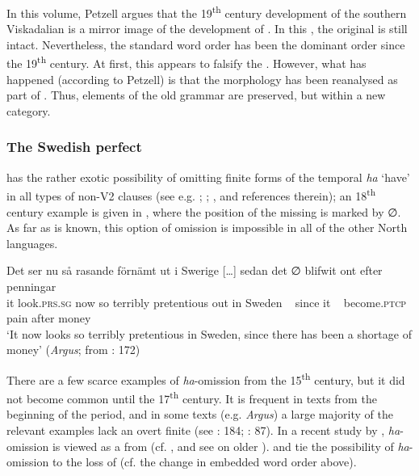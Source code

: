 \documentclass[output=paper]{langscibook}
\begin{document}
In this volume, Petzell argues that the 19\textsuperscript{th} century development of the southern Viskadalian  is a mirror image of the development of . In this , the original  is still intact. Nevertheless, the standard word order has been the dominant order since the 19\textsuperscript{th} century. At first, this appears to falsify the . However, what has happened (according to Petzell) is that the  morphology has been reanalysed as part of . Thus, elements of the old grammar are preserved, but within a new category.


\subsubsection{ The Swedish perfect}\label{sec:intro:3.1.2}


 has the rather exotic possibility of omitting finite forms of the temporal  \textit{ha} ‘have’ in all types of non-V2 clauses (see e.g. \citealt{Julien2002}; \citealt{AndreassonEtAl2004}; \citealt{Backstrom2019}, and references therein); an 18\textsuperscript{th} century example is given in , where the position of the missing  is marked by ∅. As far as is known, this option of  omission is impossible in all of the other North  languages.


\ea\label{ex:intro:6}
\gll  Det     ser         nu   så rasande   förnämt   ut     i   Swerige […] sedan   det ∅ blifwit     ont     efter penningar\\
it     look.\textsc{prs.sg}   now   so terribly   pretentious out in   Sweden ~ since   it  ~ become\textsc{.ptcp}  pain    after money\\
\glt ‘It now looks so terribly pretentious in Sweden, since there has been a shortage of money’ (\textit{Argus}; from \citealt{Johannisson1945}: 172)
\z


There are a few scarce examples of \textit{ha}{}-omission from the 15\textsuperscript{th} century, but it did not become common until the 17\textsuperscript{th} century. It is frequent in texts from the beginning of the  period, and in some texts (e.g. \textit{Argus}) a large majority of the relevant examples lack an overt finite  (see \citealt{Johannisson1945}: 184; \citealt{Backstrom2019}: 87). In a recent study by \citet{Backstrom2019}, \textit{ha}{}-omission is viewed as a  from  (cf. \citealt{Johannisson1945}, and see \citealt{Breitbarth2005} on older ). \citet{Larsson2009} and \citet{Sangfelt2019} tie the possibility of \textit{ha}{}-omission to the loss of   (cf. the change in embedded word order above).
\end{document}
